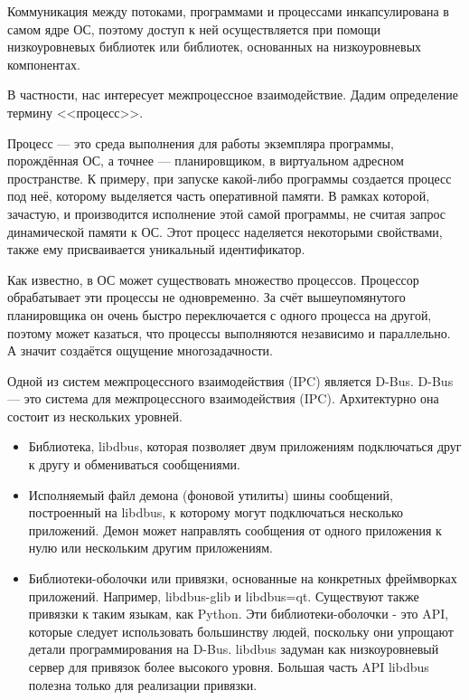 \documentclass[bachelor, och, pract]{SCWorks}
\begin{document}
Коммуникация между потоками, программами и процессами инкапсулирована в самом ядре ОС, поэтому доступ к ней осуществляется при помощи низкоуровневых библиотек или библиотек, основанных на низкоуровневых компонентах.

В частности, нас интересует межпроцессное взаимодействие. Дадим определение термину <<процесс>>.

Процесс --- это среда выполнения для работы экземпляра программы, порождённая ОС, а точнее --- планировщиком, в виртуальном адресном пространстве.
К примеру, при запуске какой-либо программы создается процесс под неё, которому выделяется часть оперативной памяти.
В рамках которой, зачастую, и производится исполнение этой самой программы, не считая запрос динамической памяти к ОС.
Этот процесс наделяется некоторыми свойствами, также ему присваивается уникальный идентификатор.

Как известно, в ОС может существовать множество процессов.
Процессор обрабатывает эти процессы не одновременно.
За счёт вышеупомянутого планировщика он очень быстро переключается с одного процесса на другой, поэтому может казаться, что процессы выполняются независимо и параллельно.
А значит создаётся ощущение многозадачности.

Одной из систем межпроцессного взаимодействия (IPC) является D-Bus.
D-Bus --- это система для межпроцессного взаимодействия (IPC). Архитектурно она состоит из нескольких уровней.

\begin{itemize}
    \item Библиотека, libdbus, которая позволяет двум приложениям подключаться друг к другу и обмениваться сообщениями.
    \item Исполняемый файл демона (фоновой утилиты) шины сообщений, построенный на libdbus, к которому могут подключаться несколько приложений.
        Демон может направлять сообщения от одного приложения к нулю или нескольким другим приложениям.
    \item Библиотеки-оболочки или привязки, основанные на конкретных фреймворках приложений.
        Например, libdbus-glib и libdbus=qt. Существуют также привязки к таким языкам, как Python.
        Эти библиотеки-оболочки - это API, которые следует использовать большинству людей, поскольку они упрощают детали программирования на D-Bus.
        libdbus задуман как низкоуровневый сервер для привязок более высокого уровня.
        Большая часть API libdbus полезна только для реализации привязки.
\end{itemize}
\end{document}
